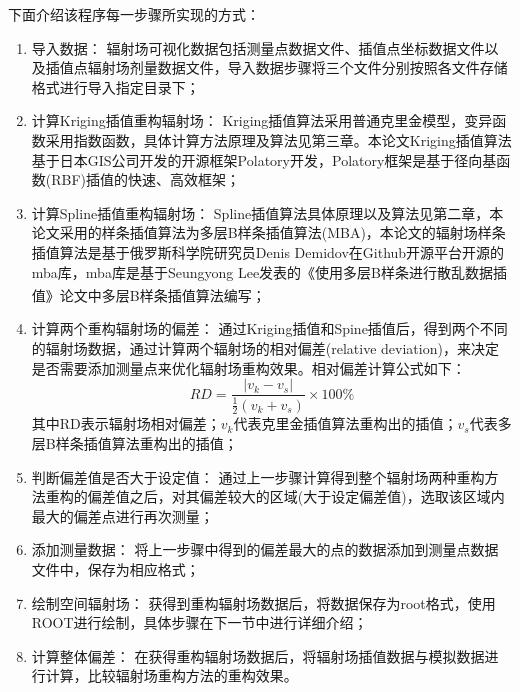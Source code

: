 下面介绍该程序每一步骤所实现的方式：
\begin{enumerate}
      \renewcommand{\labelenumi}{(\theenumi)}
      \item 导入数据：
            \newline 辐射场可视化数据包括测量点数据文件、插值点坐标数据文件以及插值点辐射场剂量数据文件，导入数据步骤将三个文件分别按照各文件存储格式进行导入指定目录下；
      \item 计算Kriging插值重构辐射场：
            \newline Kriging插值算法采用普通克里金模型，变异函数采用指数函数，具体计算方法原理及算法见第三章。本论文Kriging插值算法基于日本GIS公司开发的开源框架Polatory开发，Polatory框架是基于径向基函数(RBF)插值的快速、高效框架；
      \item 计算Spline插值重构辐射场：
            \newline Spline插值算法具体原理以及算法见第二章，本论文采用的样条插值算法为多层B样条插值算法(MBA)，本论文的辐射场样条插值算法是基于俄罗斯科学院研究员Denis Demidov在Github开源平台开源的mba库，mba库是基于Seungyong Lee发表的《使用多层B样条进行散乱数据插值》论文中多层B样条插值算法\textsuperscript{\cite{Lee1997}}编写；
      \item 计算两个重构辐射场的偏差：
            \newline 通过Kriging插值和Spine插值后，得到两个不同的辐射场数据，通过计算两个辐射场的相对偏差(relative deviation)，来决定是否需要添加测量点来优化辐射场重构效果。相对偏差计算公式如下：
            \begin{equation}
                  RD = \frac{| v_{k} - v_{s} |}{\frac{1}{2}(v_{k} + v_{s})} \times 100\%
                  \label{辐射场偏差公式}
            \end{equation}
            其中RD表示辐射场相对偏差；$ v_{k} $代表克里金插值算法重构出的插值；$ v_{s} $代表多层B样条插值算法重构出的插值；
      \item 判断偏差值是否大于设定值：
            \newline 通过上一步骤计算得到整个辐射场两种重构方法重构的偏差值之后，对其偏差较大的区域(大于设定偏差值)，选取该区域内最大的偏差点进行再次测量；
      \item 添加测量数据：
            \newline 将上一步骤中得到的偏差最大的点的数据添加到测量点数据文件中，保存为相应格式；
      \item 绘制空间辐射场：
            \newline 获得到重构辐射场数据后，将数据保存为root格式，使用ROOT进行绘制，具体步骤在下一节中进行详细介绍；
      \item 计算整体偏差：
            \newline 在获得重构辐射场数据后，将辐射场插值数据与模拟数据进行计算，比较辐射场重构方法的重构效果。
\end{enumerate}